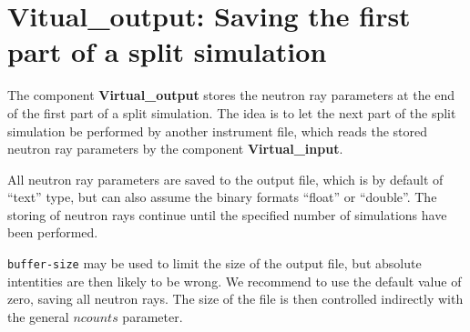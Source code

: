 \section{Vitual\_output: Saving the first part of a split simulation}
\label{virtual_output}


The component {\bf Virtual\_output} stores the neutron ray parameters
at the end of the first part of a split simulation. The idea is to let the
next part of the split simulation be performed by another instrument file,
which reads the stored neutron ray
parameters by the component {\bf Virtual\_input}.

All neutron ray parameters are saved to the output file, which is by default
of ``text'' type, but can also assume the binary formats
``float'' or ``double''. The storing of neutron rays continue until the
specified number of simulations have been performed.

\verb+buffer-size+ may be used to limit the size of the output file, but 
absolute intentities are then likely to be wrong. 
We recommend to use the default value of zero, saving all neutron rays. 
The size of the file is then controlled indirectly with 
the general $ncounts$ parameter.
